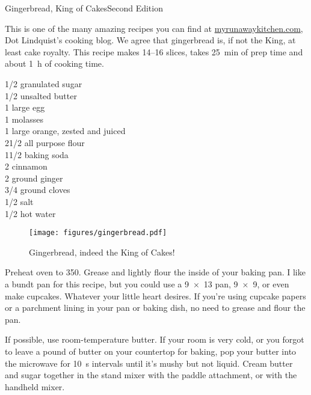\begin{entry}{Gingerbread, King of Cakes}{Second Edition}

\begin{open}
    This is one of the many amazing recipes you can find at
    \url{myrunawaykitchen.com}, Dot Lindquist's cooking blog.  We agree that
    gingerbread is, if not the King, at least cake royalty.  This recipe makes
    \numrange{14}{16} slices, takes \SI{25}{\minute} of prep time and about
    \SI{1}{\hour} of cooking time.
\end{open}
\begin{ingredients}
    \SI{1/2}{\cup}  granulated sugar\\
    \SI{1/2}{\cup}  unsalted butter\\
    1 large egg\\
    \SI{1}{\cup} molasses\\
    1 large orange, zested and juiced\\
    2\SI{1/2}{\cup}  all purpose flour\\
    1\SI{1/2}{\teaspoon}  baking soda\\
    \SI{2}{\teaspoon} cinnamon\\
    \SI{2}{\teaspoon} ground ginger\\
    \SI{3/4}{\teaspoon}   ground cloves\\
    \SI{1/2}{\teaspoon}  salt\\
    \SI{1/2}{\cup}  hot water
\end{ingredients}
\begin{figure}
    \centering
    \texttt{[image: figures/gingerbread.pdf]}
    \caption{Gingerbread, indeed the King of Cakes!}
\end{figure}
Preheat oven to \SI{350}{\degreeF}. Grease and lightly flour the inside of your
baking pan. I like a bundt pan for this recipe, but you could use a
\SI{9x13}{\inch} pan, \SI{9x9}{\inch}, or even make cupcakes. Whatever your
little heart desires. If you're using cupcake papers or a parchment lining in
your pan or baking dish, no need to grease and flour the pan.

If possible, use room-temperature butter. If your room is very cold, or you
forgot to leave a pound of butter on your countertop for baking, pop your butter
into the microwave for \SI{10}{\second} intervals until it's mushy but not
liquid. Cream butter and sugar together in the stand mixer with the paddle
attachment, or with the handheld mixer.


\end{entry}
